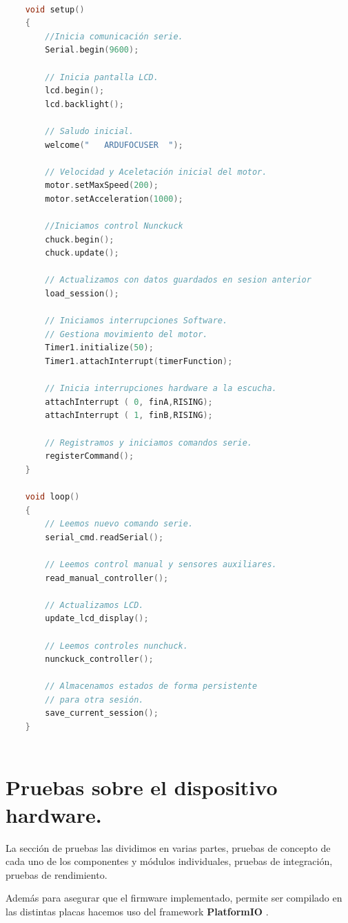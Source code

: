\begin{lstlisting}[language=C, caption={Núcleo implementación firmware  ardufocuser},label={lst:nucleo_firmware_ardufocuser }]

	void setup()
	{
		//Inicia comunicación serie.
		Serial.begin(9600);
		
		// Inicia pantalla LCD.
		lcd.begin();
		lcd.backlight();
		
		// Saludo inicial.
		welcome("   ARDUFOCUSER  ");
		
		// Velocidad y Aceletación inicial del motor.
		motor.setMaxSpeed(200);
		motor.setAcceleration(1000);
		
		//Iniciamos control Nunckuck
		chuck.begin();
		chuck.update();
		
		// Actualizamos con datos guardados en sesion anterior
		load_session();
		
		// Iniciamos interrupciones Software.
		// Gestiona movimiento del motor.
		Timer1.initialize(50);
		Timer1.attachInterrupt(timerFunction);
		
		// Inicia interrupciones hardware a la escucha.
		attachInterrupt ( 0, finA,RISING);
		attachInterrupt ( 1, finB,RISING);
		
		// Registramos y iniciamos comandos serie.
		registerCommand();
	}
	
	void loop()
	{
		// Leemos nuevo comando serie.
		serial_cmd.readSerial();
		
		// Leemos control manual y sensores auxiliares.
		read_manual_controller();
		
		// Actualizamos LCD.
		update_lcd_display();
		
		// Leemos controles nunchuck.
		nunckuck_controller();
		
		// Almacenamos estados de forma persistente 
		// para otra sesión.
		save_current_session();
	}



\end{lstlisting}



\section{Pruebas sobre el dispositivo hardware.}


La sección de pruebas las dividimos en varias partes, pruebas de concepto de cada uno de los componentes y módulos individuales, pruebas de integración, pruebas de rendimiento. 

Además para asegurar que el firmware implementado, permite ser compilado en las distintas placas hacemos uso del framework   \textbf{PlatformIO} \cite{patform}.

